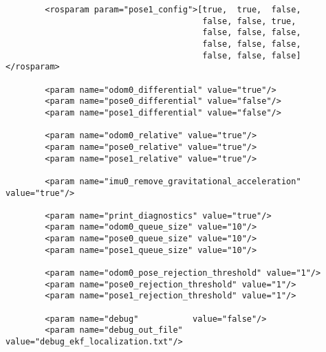 \begin{center}
\begin{footnotesize}
\begin{verbatim}
        <rosparam param="pose1_config">[true,  true,  false,
                                        false, false, true,
                                        false, false, false,
                                        false, false, false,
                                        false, false, false]</rosparam>

        <param name="odom0_differential" value="true"/>
        <param name="pose0_differential" value="false"/>
        <param name="pose1_differential" value="false"/>

        <param name="odom0_relative" value="true"/>
        <param name="pose0_relative" value="true"/>
        <param name="pose1_relative" value="true"/>

        <param name="imu0_remove_gravitational_acceleration" value="true"/>

        <param name="print_diagnostics" value="true"/>
        <param name="odom0_queue_size" value="10"/>
        <param name="pose0_queue_size" value="10"/>
        <param name="pose1_queue_size" value="10"/>

        <param name="odom0_pose_rejection_threshold" value="1"/>
        <param name="pose0_rejection_threshold" value="1"/>
        <param name="pose1_rejection_threshold" value="1"/>

        <param name="debug"           value="false"/>
        <param name="debug_out_file"  value="debug_ekf_localization.txt"/>



\end{verbatim}
\end{footnotesize}
\end{center}
